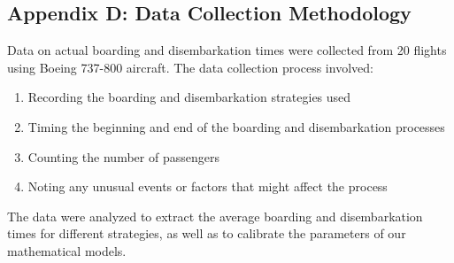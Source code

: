 \documentclass[12pt,a4paper]{article}
\begin{document}
\subsection{Appendix D: Data Collection Methodology}

Data on actual boarding and disembarkation times were collected from 20 flights using Boeing 737-800 aircraft. The data collection process involved:

\begin{enumerate}
    \item Recording the boarding and disembarkation strategies used
    \item Timing the beginning and end of the boarding and disembarkation processes
    \item Counting the number of passengers
    \item Noting any unusual events or factors that might affect the process
\end{enumerate}

The data were analyzed to extract the average boarding and disembarkation times for different strategies, as well as to calibrate the parameters of our mathematical models.
\end{document}
